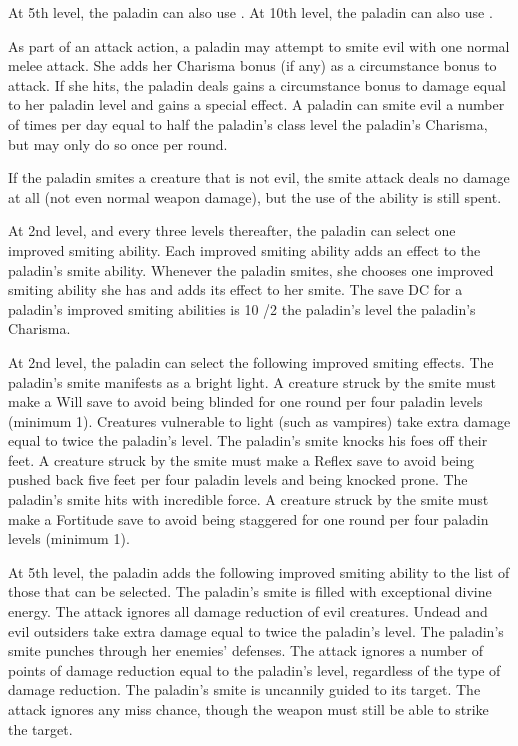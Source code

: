 At 5th level, the paladin can also use . At 10th level, the paladin can also use .

 As part of an attack action, a paladin may attempt to smite evil with one normal melee attack. She adds her Charisma bonus (if any) as a circumstance bonus to attack. If she hits, the paladin deals gains a circumstance bonus to damage equal to her paladin level and gains a special effect.  A paladin can smite evil a number of times per day equal to half the paladin's class level \add the paladin's Charisma, but may only do so once per round.

If the paladin smites a creature that is not evil, the smite attack deals no damage at all (not even normal weapon damage), but the use of the ability is still spent.

 At 2nd level, and every three levels thereafter, the paladin can select one improved smiting ability. Each improved smiting ability adds an effect to the paladin's smite ability. Whenever the paladin smites, she chooses one improved smiting ability she has and adds its effect to her smite. The save DC for a paladin's improved smiting abilities is 10 /2 the paladin's level \add the paladin's Charisma.
\par At 2nd level, the paladin can select the following improved smiting effects.
 The paladin's smite manifests as a bright light. A creature struck by the smite must make a Will save to avoid being blinded for one round per four paladin levels (minimum 1). Creatures vulnerable to light (such as vampires) take extra damage equal to twice the paladin's level.
 The paladin's smite knocks his foes off their feet. A creature struck by the smite must make a Reflex save to avoid being pushed back five feet per four paladin levels and being knocked prone.
 The paladin's smite hits with incredible force. A creature struck by the smite must make a Fortitude save to avoid being staggered for one round per four paladin levels (minimum 1).

At 5th level, the paladin adds the following improved smiting ability to the list of those that can be selected.
 The paladin's smite is filled with exceptional divine energy. The attack ignores all damage reduction of evil creatures. Undead and evil outsiders take extra damage equal to twice the paladin's level.
 The paladin's smite punches through her enemies' defenses. The attack ignores a number of points of damage reduction equal to the paladin's level, regardless of the type of damage reduction.
 The paladin's smite is uncannily guided to its target. The attack ignores any miss chance, though the weapon must still be able to strike the target.

